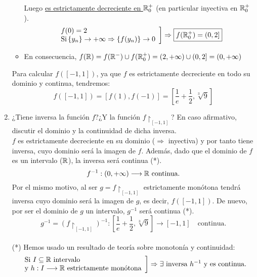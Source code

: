 \documentclass[12pt]{article}
\begin{document}
\begin{ejercicio}[3 puntos]
\begin{enumerate}
\begin{itemize}
				Luego \underline{es estrictamente decreciente en ${\mathbb{R}}_0^+$} (en particular inyectiva en ${\mathbb{R}}_0^+$). 
				\[
				\left.
				\begin{array}{l}
					f(0)=2 \\
					\text{Si} \left\{y_n\right\} \rightarrow +\infty \Rightarrow \left\{f(y_n)\right\} \rightarrow 0
				\end{array}
				\right]
				\Rightarrow \boxed{f({\mathbb{R}}_0^+) = \left(0, 2 \right]}
				\]
				\item[\textasteriskcentered] En consecuencia, $f({\mathbb{R}})= f({\mathbb{R}}^-) \cup f({\mathbb{R}}^+_0) = \left(2, +\infty\right) \cup  \left(0, 2 \right] = \left(0, +\infty \right)$
			\end{itemize}
			
			Para calcular $f(\left[-1,1\right])$, ya que $f$ es estrictamente decreciente en todo su dominio y continua, tendremos: $$f(\left[-1,1\right]) = \left[f(1), f(-1)\right]= \left[\frac{1}{e} + \frac{1}{2}, \sqrt[3]{9}\right]$$
			
			\item ¿Tiene inversa la función $f$?¿Y la función $f\restriction_{[-1,1]}$? En caso afirmativo, discutir el dominio y la continuidad de dicha inversa. \\
			$f$ es estrictamente decreciente en su dominio ($\Rightarrow$ inyectiva) y por tanto  tiene inversa, cuyo dominio será la imagen de $f$. Además, dado que el dominio de $f$ es un intervalo (${\mathbb{R}}$), la inversa será continua (*). \\
			$$ f^{-1}: (0, +\infty) \longrightarrow {\mathbb{R}} \text{ continua.}$$
			Por el mismo motivo, al ser $g= f\restriction_{[-1,1]}$ estrictamente monótona tendrá inversa cuyo dominio será la imagen de $g$, es decir, $f([-1,1])$. De nuevo, por ser el dominio de $g$ un intervalo, $g^{-1}$ será continua (*). \\
			$$ g^{-1}=(f\restriction_{[-1,1]})^{-1}: \left[\frac{1}{e} + \frac{1}{2}, \sqrt[3]{9}\right] \longrightarrow \left[-1,1\right] \quad \text{continua.}$$ \\
			
			(*) Hemos usado un resultado de teoría sobre monotonía y continuidad:
			\[
			\left.
			\begin{array}{l}
				\text{Si } I \subseteq {\mathbb{R}} \text{ intervalo} \\
				\text{y } h:I \longrightarrow {\mathbb{R}} \text{ estrictamente monótona}
			\end{array}
			\right]
			\Rightarrow \exists \text{ inversa } h^{-1} \text{ y es continua.}
			\]
			

		\end{enumerate}		
	\end{ejercicio}
\end{document}
